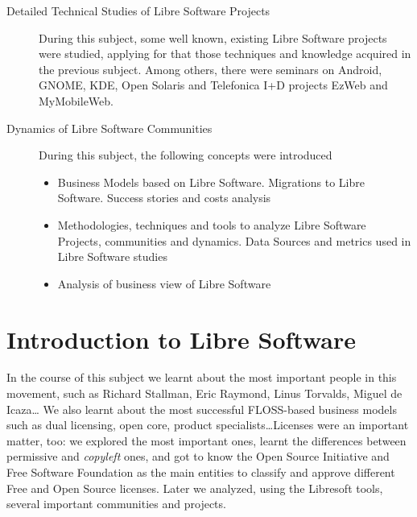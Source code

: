 \begin{description}
\item[Detailed Technical Studies of Libre Software Projects]

During this subject, some well known, existing Libre Software projects were studied, applying for that those techniques
and knowledge acquired in the previous subject. Among others, there were seminars on Android, GNOME, KDE, Open Solaris
and Telefonica I+D projects EzWeb and MyMobileWeb.

\item[Dynamics of Libre Software Communities]

During this subject, the following concepts were introduced
\begin{itemize}
\item Business Models based on Libre Software. Migrations to Libre Software.
Success stories and costs analysis
\item Methodologies, techniques and tools to analyze Libre Software Projects, communities and dynamics.
Data Sources and metrics used in Libre Software studies
\item Analysis of business view of Libre Software
\end{itemize}

\end{description}

\section{Introduction to Libre Software}

In the course of this subject we learnt about the most important people in this movement,
such as Richard Stallman, Eric Raymond, Linus Torvalds, Miguel de Icaza\dots
We also learnt about the most successful FLOSS-based business models\cite{flossmetrics:bm}
such as dual licensing, open core, product specialists\dots Licenses were
an important matter, too: we explored the most important ones, learnt the
differences between permissive and {\it copyleft} ones, and got to know the Open Source
Initiative and Free Software Foundation as the main entities to classify and
approve different Free and Open Source licenses. Later we analyzed, using the
Libresoft tools\cite{libresoft:tools, moodle:libresoft_tools, melquiades:libresoft_tools},
several important communities and projects.

